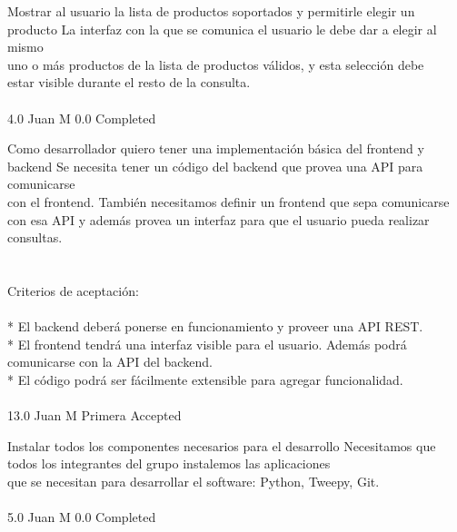 		{Mostrar al usuario la lista de productos soportados y permitirle elegir un producto} %
		{La interfaz con la que se comunica el usuario le debe dar a elegir al mismo\\
uno o más productos de la lista de productos válidos, y esta selección debe\\
estar visible durante el resto de la consulta.\\
\\
} %
		{4.0} %
		{Juan M} %
		{0.0} %
		{Completed} %


\vspace{20pt}

	{Como desarrollador quiero tener una implementación básica del frontend y backend} %
	{Se necesita tener un código del backend que provea una API para comunicarse\\
con el frontend. También necesitamos definir un frontend que sepa comunicarse\\
con esa API y además provea un interfaz para que el usuario pueda realizar\\
consultas.\\
\\
  \\
Criterios de aceptación:\\
\\
* El backend deberá ponerse en funcionamiento y proveer una API REST.  \\
* El frontend tendrá una interfaz visible para el usuario. Además podrá comunicarse con la API del backend.  \\
* El código podrá ser fácilmente extensible para agregar funcionalidad.\\
\\
} %
	{} %
	{13.0} %
	{Juan M} %
	{Primera} %
	{Accepted} %

		{Instalar todos los componentes necesarios para el desarrollo} %
		{Necesitamos que todos los integrantes del grupo instalemos las aplicaciones\\
que se necesitan para desarrollar el software: Python, Tweepy, Git.\\
\\
} %
		{5.0} %
		{Juan M} %
		{0.0} %
		{Completed} %

